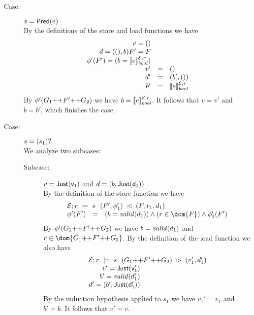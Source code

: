 {\begin{description}
\item[Case:] $s = \mathsf{Pred}(e)$\\[1ex]
%
By the definitions of the store and load functions we have
\[
\begin{array}{rcll}
v = ()\\
d = ((),b)
F' = F\\
\phi'(F') = (b = [\![e]\!]^{\mathcal{E},r}_{\mathit{bool}})\\
v' &=& ()\\
d' &=& (b',())\\
b' &=& [\![e]\!]^{\mathcal{E},r}_{\mathit{bool}}\\
\end{array}
\]
By $\phi'(G_1 \text{++} F' \text{++} G_2)$ we have $b =
[\![e]\!]^{\mathcal{E},r}_{\mathit{bool}}$. It follows that $v = v'$ and $b =
b'$, which finishes the case.

\item[Case:] $s = (s_1)?$\\[1ex]
%
We analyze two subcases:
\begin{description}
\item[Subcase:] $v = \mathsf{Just(v_1)}$ and $d = (b,\mathsf{Just(d_1)})$\\[1ex]
%
By the definition of the store function we have
\[
\begin{array}{rcll}
\multicolumn{3}{l}{\store{\Env}{F}{r}{ v_1,d_1 }{s}{ F',\phi_1' }}\\
\phi'(F') &=& (b = \valid{d_1}) \wedge (r \in \dom{F}) \wedge \phi_1'(F')
\end{array}
\]
%
By $\phi'(G_1 \text{++} F' \text{++} G_2)$ we have $b = \mathit{valid}(d_1)$ and
$r \in \dom{G_1 \FAppend F' \FAppend G_2}$.  By the definition of the
load function we also have
\[ 
\begin{array}{rcll}
\multicolumn{3}{l}{\load{\Env}{(G_1 \FAppend F' \FAppend G_2)}{r}{s}{v_1',d_1'}}\\
v' = \Just{v_1'}\\
b' = \valid{d_1'}\\
d' = (b',\Just{d_1'})\\
\end{array}
\]
By the induction hypothesis applied to $s_1$ we have $v_1' = v_1$ and
$b' = b$. It follows that $v' = v$.


\end{description}
\end{description}}
